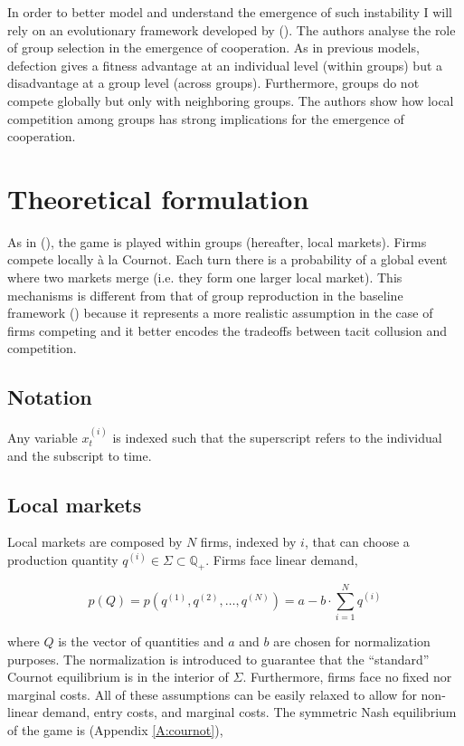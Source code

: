 \documentclass[american]{scrartcl}
\newcommand{\Rat}{\mathbb{Q}}
\newcommand{\citein}[1]{\citeauthor{#1} (\citeyear{#1})}
\begin{document}
In order to better model and understand the emergence of such instability I will rely on an evolutionary framework developed by \citein{Akdeniz2020}. The authors analyse the role of group selection in the emergence of cooperation. As in previous models, defection gives a fitness advantage at an individual level (within groups) but a disadvantage at a group level (across groups). Furthermore, groups do not compete globally but only with neighboring groups. The authors show how local competition among groups has strong implications for the emergence of cooperation.

\section{Theoretical formulation}

As in \citein{Akdeniz2020}, the game is played within groups (hereafter, local markets). Firms compete locally à la Cournot. Each turn there is a probability of a global event where two markets merge (i.e. they form one larger local market). This mechanisms is different from that of group reproduction in the baseline framework (\cite{Akdeniz2020}) because it represents a more realistic assumption in the case of firms competing and it better encodes the tradeoffs between tacit collusion and competition.

\subsection{Notation}

Any variable $x^{(i)}_t$ is indexed such that the superscript refers to the individual and the subscript to time.

\subsection{Local markets}

Local markets are composed by $N$ firms, indexed by $i$, that can choose a production quantity $q^{(i)} \in \Sigma \subset \Rat_+$. Firms face linear demand,

\begin{equation}
    p(Q) = p\left(q^{(1)}, q^{(2)},  \ldots, q^{(N)} \right) = a - b \cdot \sum^{N}_{i=1} q^{(i)}
\end{equation}

where $Q$ is the vector of quantities and $a$ and $b$ are chosen for normalization purposes. The normalization is introduced to guarantee that the ``standard'' Cournot equilibrium is in the interior of $\Sigma$. Furthermore, firms face no fixed nor marginal costs. All of these assumptions can be easily relaxed to allow for non-linear demand, entry costs, and marginal costs. The symmetric Nash equilibrium of the game is (Appendix \ref{A:cournot}),
\end{document}
